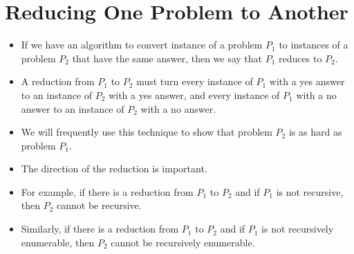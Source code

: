 \documentclass[]{article}
\begin{document}
\section{Reducing One Problem to Another}
  \begin{itemize}
    \item If we have an algorithm to convert instance of a problem $P_1$ to
    instances of a problem $P_2$ that have the same answer, then we say that
    $P_1$ reduces to $P_2$.
    \item A reduction from $P_1$ to $P_2$ must turn every instance of $P_1$ with
    a yes answer to an instance of $P_2$ with a yes answer, and every instance 
    of $P_1$ with a no answer to an instance of $P_2$ with a no answer.
    \item We will frequently use this technique to show that problem $P_2$ is as
    hard as problem $P_1$.
    \item The direction of the reduction is important.
    \item For example, if there is a reduction from $P_1$ to $P_2$ and if $P_1$
    is not recursive, then $P_2$ cannot be recursive.
    \item Similarly, if there is a reduction from $P_1$ to $P_2$ and if $P_1$ is
    not recursively enumerable, then $P_2$ cannot be recursively enumerable.
  \end{itemize}
\end{document}
